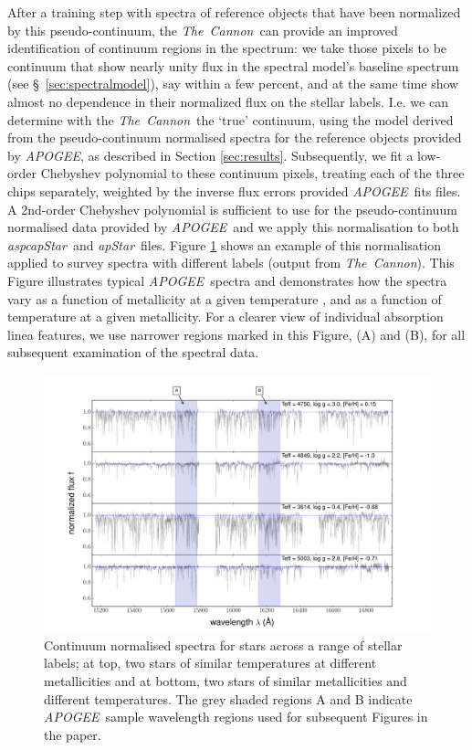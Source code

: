 \documentclass[12pt, preprint]{aastex}
\newcommand{\tc}{\textsl{The~Cannon}}
\newcommand{\apogee}{\textsl{APOGEE}}
\newcommand{\aspcapstar}{\textsl{aspcapStar}}
\newcommand{\apstar}{\textsl{apStar}}
\begin{document}
After a training step with spectra of reference objects that have been  normalized  by this pseudo-continuum,
the \tc\ can provide an improved identification of continuum regions in the spectrum: 
we take those pixels to be continuum that show nearly unity flux in the spectral model's baseline spectrum (see \S~\ref{sec:spectralmodel}), 
say within a few percent, and at the same time show almost no dependence in their normalized flux on the stellar labels.
I.e. we can determine with the \tc\ the `true' continuum, using the model derived from the pseudo-continuum normalised spectra for the reference objects provided by \apogee, as described in Section \ref{sec:results}. Subsequently, we fit a low-order Chebyshev polynomial to these continuum pixels,
 treating each of the three chips separately, weighted by the inverse flux errors provided \apogee\ fits files. A 2nd-order Chebyshev polynomial is sufficient to use for the pseudo-continuum normalised data provided by \apogee\ and we apply this normalisation to both \aspcapstar\ and  \apstar\ files. 
Figure \ref{fig:norm} shows an example of this normalisation applied to survey spectra with different labels (output from \tc). 
This Figure illustrates typical \apogee\ spectra and demonstrates how the spectra 
vary as a function of metallicity at a given temperature , and as a function of temperature at a given metallicity. 
For a clearer view of individual absorption linea features, we use narrower regions marked in this Figure, (A) and (B), for all subsequent examination of the spectral data. 


\begin{figure}[h!]
  \includegraphics[width=\hsize]{./plots/four_examples3.pdf}
\caption{Continuum normalised spectra for stars across a range of stellar labels; at top, two stars of similar temperatures at different metallicities and at bottom, two stars of similar metallicities and different temperatures. The grey shaded regions A and B indicate \apogee\ sample wavelength regions used for subsequent Figures in the paper.}
\label{fig:norm}
\end{figure}
\end{document}
